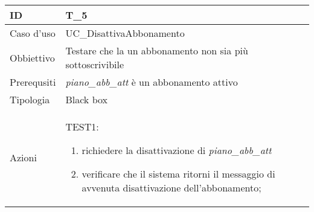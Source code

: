 \begin{table}[hb]
    \centering
    \begin{tabular}{ |p{2cm}|p{10cm}|  }
        \hline
        ID & T\_5 \\\hline
        Caso d'uso & UC\_DisattivaAbbonamento \\\hline   
        Obbiettivo & Testare che la un abbonamento non sia più sottoscrivibile  \\\hline
        Prerequsiti & \emph{piano\_abb\_att} è un abbonamento attivo \\\hline
        Tipologia & Black box \\\hline
        Azioni & 
        TEST1:
        \begin{enumerate}[topsep=0pt]
            \item richiedere la disattivazione di \emph{piano\_abb\_att}
            \item verificare che il sistema ritorni il messaggio di avvenuta disattivazione dell'abbonamento;
        \end{enumerate}
        \\\hline
    \end{tabular}
\end{table}


